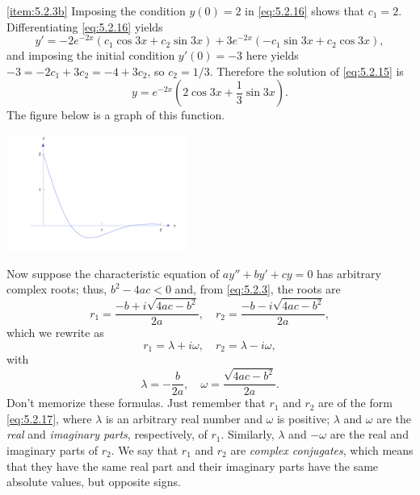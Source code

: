 \documentclass{ximera}
\begin{document}
\begin{example}
\begin{explanation}
\ref{item:5.2.3b}   Imposing the condition $y(0)=2$
in   \eqref{eq:5.2.16} shows that $c_1=2$.  Differentiating
\eqref{eq:5.2.16} yields
$$
y'=-2e^{-2x}(c_1\cos 3x+c_2\sin 3x) +3e^{-2x}(-c_1\sin 3x +c_2\cos 3x),
$$
and imposing the initial condition $y'(0)=-3$ here yields
$-3=-2c_1+3c_2=-4+3c_2$,
 so $c_2=1/3$. Therefore the solution of
\eqref{eq:5.2.15} is
$$
y=e^{-2x}(2\cos 3x+ \frac{1}{3}\sin 3x).
$$
The figure below is a graph of this function.

\begin{image}
 \includegraphics[height=1.5in]{fig050203.jpg}
 \end{image}
\end{explanation}
\end{example}


Now suppose   the characteristic equation of $ay''+by'+cy=0$ has
arbitrary complex roots;   thus, $b^2-4ac<0$ and, from \eqref{eq:5.2.3},
the
roots are
$$
r_1 = \frac{-b+i\sqrt{4ac-b^2}}{2a},\quad r_2 =
\frac{-b-i\sqrt{4ac-b^2}}{2a},
$$
which we rewrite as
\begin{equation} \label{eq:5.2.17}
r_1=\lambda+i \omega,\quad r_2 = \lambda - i \omega,
\end{equation}
 with
$$
\lambda = -\frac{b}{2a},\quad \omega = \frac{\sqrt{4ac-b^2}}{2a}.
$$
Don't memorize these formulas. Just remember that $r_1$
and $r_2$ are of the form \eqref{eq:5.2.17},
where  $\lambda$ is an arbitrary real number and $\omega$
is   positive;
 $\lambda$ and $\omega$ are  the \textit{real}
and \textit{imaginary parts}, respectively, of $r_1$.
Similarly, $\lambda$ and $-\omega$ are the real and imaginary parts of
$r_2$. We say that $r_1$ and $r_2$ are \textit{complex conjugates},
which means that they have the same real part and their imaginary
parts have the same absolute values, but opposite signs.
\end{document}
